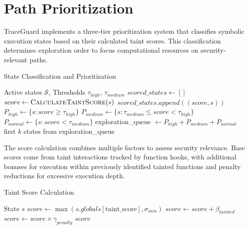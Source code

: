 \section{Path Prioritization}

TraceGuard implements a three-tier prioritization system that classifies symbolic execution states based on their calculated taint scores. This classification determines exploration order to focus computational resources on security-relevant paths.

\begin{algorithm}[H]
    \caption{State Classification and Prioritization}
    \label{alg:state_classification}
    \begin{algorithmic}[1]
        \Require Active states $\mathcal{S}$, Thresholds $\tau_{high}$, $\tau_{medium}$
        \State $scored\_states \gets []$
        \State $score \gets \textsc{CalculateTaintScore}(s)$
        \State $scored\_states.append((score, s))$
        \EndFor
        \State $P_{high} \gets \{s : score \geq \tau_{high}\}$
        \State $P_{medium} \gets \{s : \tau_{medium} \leq score < \tau_{high}\}$ 
        \State $P_{normal} \gets \{s : score < \tau_{medium}\}$
        \State exploration\_queue $\gets P_{high} + P_{medium} + P_{normal}$
        \State \Return first $k$ states from exploration\_queue
    \end{algorithmic}
\end{algorithm}

The score calculation combines multiple factors to assess security relevance. Base scores come from taint interactions tracked by function hooks, with additional bonuses for execution within previously identified tainted functions and penalty reductions for excessive execution depth.

\begin{algorithm}[H]
    \caption{Taint Score Calculation}
    \label{alg:taint_score_calculation}
    \begin{algorithmic}[1]
        \Require State $s$
        \State $score \gets \max(s.globals[\text{taint\_score}], \sigma_{min})$
        \State $score \gets score + \beta_{tainted}$
        \EndIf
        \State $score \gets score \times \gamma_{penalty}$
        \EndIf
        \State \Return $score$
    \end{algorithmic}
\end{algorithm}

